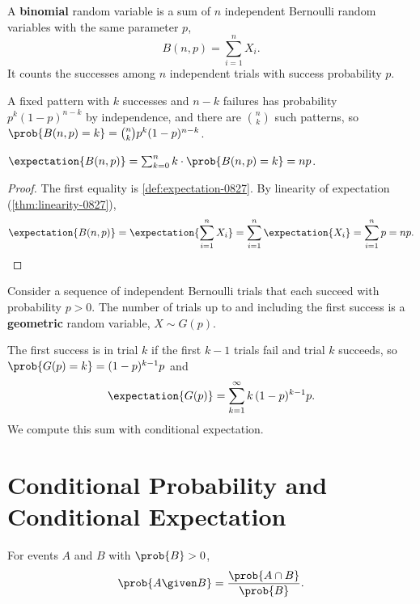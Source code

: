 \begin{definition}\label{def:binomial-0827}
    A \textbf{binomial} random variable is a sum of $n$ independent Bernoulli random variables with
    the same parameter $p$,
    \[B(n, p) = \sum_{i=1}^{n} X_i.\]
    It counts the successes among $n$ independent trials with success probability $p$.
\end{definition}

A fixed pattern with $k$ successes and $n - k$ failures has probability $p^k (1 - p)^{n - k}$ by
independence, and there are $\binom{n}{k}$ such patterns, so
$\prob{B(n, p) = k} = \binom{n}{k} p^k (1 - p)^{n - k}$.

\begin{theorem}\label{thm:binomial-0827}
    $\expectation{B(n, p)} = \sum_{k=0}^{n} k \cdot \prob{B(n, p) = k} = np$.
\end{theorem}

\begin{proof}
    The first equality is \cref{def:expectation-0827}. By linearity of expectation
    (\cref{thm:linearity-0827}),
    \[\expectation{B(n, p)} = \expectation{\sum_{i=1}^{n} X_i} = \sum_{i=1}^{n} \expectation{X_i}
        = \sum_{i=1}^{n} p = np.\]
\end{proof}

\begin{definition}\label{def:geometric-0827}
    Consider a sequence of independent Bernoulli trials that each succeed with probability $p > 0$.
    The number of trials up to and including the first success is a \textbf{geometric} random
    variable, $X \sim G(p)$.
\end{definition}

The first success is in trial $k$ if the first $k - 1$ trials fail and trial $k$ succeeds, so
$\prob{G(p) = k} = (1 - p)^{k - 1} p$ and
\[\expectation{G(p)} = \sum_{k=1}^{\infty} k \, (1 - p)^{k - 1} p.\]
We compute this sum with conditional expectation.

\section{Conditional Probability and Conditional Expectation}

\begin{definition}\label{def:condprob-0827}
    For events $A$ and $B$ with $\prob{B} > 0$,
    \[\prob{A \given B} = \frac{\prob{A \cap B}}{\prob{B}}.\]
\end{definition}

